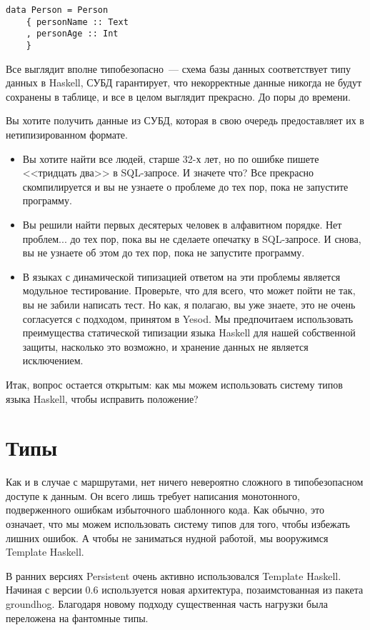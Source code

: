 \begin{lstlisting}
data Person = Person
    { personName :: Text
    , personAge :: Int
    }
\end{lstlisting}

Все выглядит вполне типобезопасно~--- схема базы данных соответствует типу данных в Haskell, СУБД гарантирует, что некорректные данные никогда не будут сохранены в таблице, и все в целом выглядит прекрасно. До поры до времени.

Вы хотите получить данные из СУБД, которая в свою очередь предоставляет их в нетипизированном формате.

\begin{itemize}
  \item Вы хотите найти все людей, старше 32-х лет, но по ошибке пишете <<тридцать два>> в SQL-запросе. И значете что? Все прекрасно скомпилируется и вы не узнаете о проблеме до тех пор, пока не запустите программу.
  \item Вы решили найти первых десятерых человек в алфавитном порядке. Нет проблем... до тех пор, пока вы не сделаете опечатку в SQL-запросе. И снова, вы не узнаете об этом до тех пор, пока не запустите программу.
  \item В языках с динамической типизацией ответом на эти проблемы является модульное тестирование. Проверьте, что для всего, что может пойти не так, вы не забили написать тест. Но как, я полагаю, вы уже знаете, это не очень согласуется с подходом, принятом в Yesod. Мы предпочитаем использовать преимущества статической типизации языка Haskell для нашей собственной защиты, насколько это возможно, и хранение данных не является исключением.
\end{itemize}

Итак, вопрос остается открытым: как мы можем использовать систему типов языка Haskell, чтобы исправить положение?

\section{Типы} %

Как и в случае с маршрутами, нет ничего невероятно сложного в типобезопасном доступе к данным. Он всего лишь требует написания монотонного, подверженного ошибкам избыточного шаблонного кода. Как обычно, это означает, что мы можем использовать систему типов для того, чтобы избежать лишних ошибок. А чтобы не заниматься нудной работой, мы вооружимся Template Haskell.

\begin{remark}
В ранних версиях Persistent очень активно использовался Template Haskell. Начиная с версии 0.6 используется новая архитектура, позаимстованная из пакета groundhog. Благодаря новому подходу существенная часть нагрузки была переложена на фантомные типы.
\end{remark}

